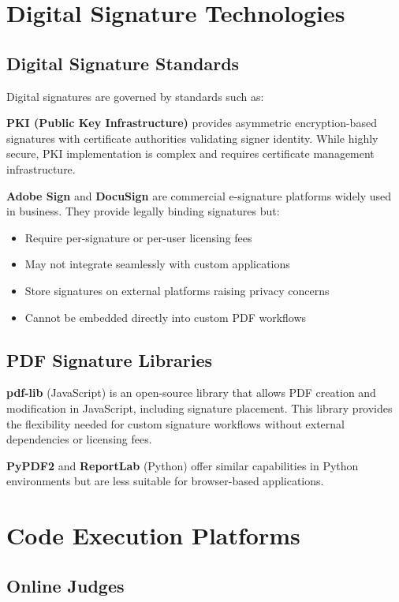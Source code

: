 \section{Digital Signature Technologies}

\subsection{Digital Signature Standards}

Digital signatures are governed by standards such as:

\textbf{PKI (Public Key Infrastructure)} provides asymmetric encryption-based signatures with certificate authorities validating signer identity. While highly secure, PKI implementation is complex and requires certificate management infrastructure.

\textbf{Adobe Sign} and \textbf{DocuSign} are commercial e-signature platforms widely used in business. They provide legally binding signatures but:
\begin{itemize}
\item Require per-signature or per-user licensing fees
\item May not integrate seamlessly with custom applications
\item Store signatures on external platforms raising privacy concerns
\item Cannot be embedded directly into custom PDF workflows
\end{itemize}

\subsection{PDF Signature Libraries}

\textbf{pdf-lib} (JavaScript) is an open-source library that allows PDF creation and modification in JavaScript, including signature placement. This library provides the flexibility needed for custom signature workflows without external dependencies or licensing fees.

\textbf{PyPDF2} and \textbf{ReportLab} (Python) offer similar capabilities in Python environments but are less suitable for browser-based applications.

\section{Code Execution Platforms}

\subsection{Online Judges}

